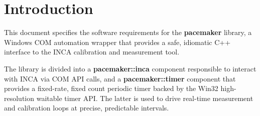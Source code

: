 \section{Introduction}

This document specifies the software requirements for the \textbf{pacemaker} library, a
Windows COM automation wrapper that provides a safe, idiomatic C++ interface to the
INCA calibration and measurement tool.

The library is divided into a \textbf{pacemaker::inca} component responsible to interact with INCA via COM API calls, and a \textbf{pacemaker::timer} component that provides a fixed-rate, fixed count periodic timer backed by the Win32 high-resolution waitable timer API. The latter is used to drive real-time measurement and calibration loops at precise, predictable intervals.
